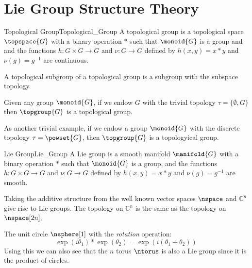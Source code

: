 \documentclass[oneside]{book}                                                  %
\begin{document}
    \chapter{Lie Group Structure Theory}
        \begin{fdefinition}{Topological Group}{Topological_Group}
            A topological group is a topological space $\topspace{G}$ with a
            binary operation $*$ such that $\monoid{G}$ is a group and and
            the functions $h:G\times{G}\rightarrow{G}$ and $\nu:G\rightarrow{G}$
            defined by $h(x,y)=x*y$ and $\nu(g)=g^{\minus{1}}$ are continuous.
        \end{fdefinition}
        A topological subgroup of a topological group is a subgroup with the
        subspace topology.
        \begin{example}
            Given any group $\monoid{G}$, if we endow $G$ with the trivial
            topology $\tau=\{\emptyset,G\}$ then $\topgroup{G}$ is a topological
            group.
        \end{example}
        \begin{example}
            As another trivial example, if we endow a group $\monoid{G}$ with
            the discrete topology $\tau=\powset{G}$, then $\topgroup{G}$ is a
            topologyical group. 
        \end{example}
        \begin{fdefinition}{Lie Group}{Lie_Group}
            A Lie group is a smooth manifold $\manifold{G}$ with a binary
            operation $*$ such that $\monoid{G}$ is a group, and the functions
            $h:G\times{G}\rightarrow{G}$ and $\nu:G\rightarrow{G}$ defined by
            $h(x,y)=x*y$ and $\nu(g)=g^{\minus{1}}$ are smooth.
        \end{fdefinition}
        \begin{example}
            Taking the additive structure from the well known vector spaces
            $\nspace$ and $\mathbb{C}^{n}$ give rise to Lie groups. The topology
            on $\mathbb{C}^{n}$ is the same as the topology on $\nspace[2n]$.
        \end{example}
        \begin{example}
            The unit circle $\nsphere[1]$ with the \textit{rotation} operation:
            \begin{equation}
                \exp(i\theta_{1})*\exp(\theta_{2})
                    =\exp(i(\theta_{1}+\theta_{2}))
            \end{equation}
            Using this we can also see that the $n$ torus $\ntorus$ is also a
            Lie group since it is the product of circles.
        \end{example}
\end{document}
